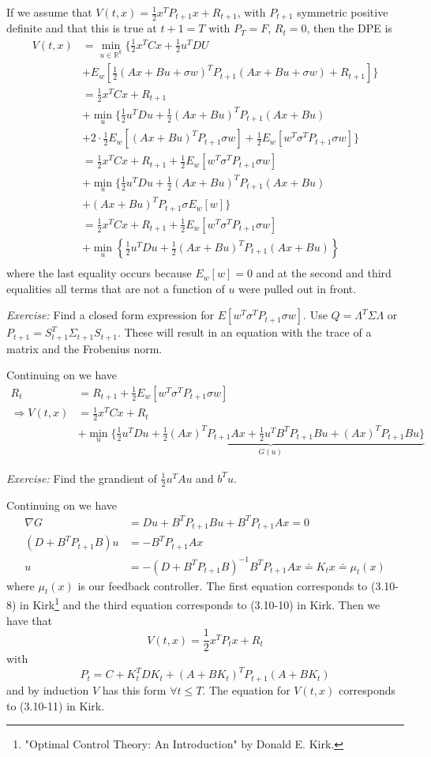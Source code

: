 If we assume that $V(t,x) = \frac{1}{2}x^TP_{t+1}x + R_{t+1}$, with $P_{t+1}$ symmetric positive definite and that this is true at $t+1=T$ with $P_T=F$, $R_t=0$, then the DPE is
\begin{align*}
V(t,x) &= \min_{u\in\mathbb{R}^k}\{\frac{1}{2}x^TCx + \frac{1}{2}u^TDU  \\
&+ E_w[\frac{1}{2}(Ax+Bu+\sigma w)^TP_{t+1}(Ax+Bu+\sigma w) + R_{t+1}]\} \\
&= \frac{1}{2}x^TCx + R_{t+1} \\
&+ \min_u \{\frac{1}{2}u^TDu + \frac{1}{2}(Ax+Bu)^TP_{t+1}(Ax+Bu) \\
&+ 2\cdot\frac{1}{2}E_w[(Ax+Bu)^TP_{t+1}\sigma w] + \frac{1}{2}E_w[w^T\sigma^TP_{t+1}\sigma w]\} \\
&= \frac{1}{2}x^TCx + R_{t+1} + \frac{1}{2}E_w[w^T\sigma^TP_{t+1}\sigma w] \\
&+ \min_u \{ \frac{1}{2}u^TDu + \frac{1}{2}(Ax+Bu)^TP_{t+1}(Ax+Bu) \\
&+ (Ax+Bu)^TP_{t+1}\sigma E_w[w] \} \\
&= \frac{1}{2}x^TCx + R_{t+1} + \frac{1}{2}E_w[w^T\sigma^TP_{t+1}\sigma w] \\
&+ \min_u \left\lbrace \frac{1}{2}u^TDu + \frac{1}{2}(Ax+Bu)^TP_{t+1}(Ax+Bu) \right\rbrace \\
\end{align*}
where the last equality occurs because $E_w[w]=0$ and at the second and third equalities all terms that are not a function of $u$ were pulled out in front.

\textit{Exercise:} Find a closed form expression for $E[w^T\sigma^TP_{t+1}\sigma w]$. Use $Q=\Lambda^T\Sigma\Lambda$ or $P_{t+1} = S_{t+1}^T\Sigma_{t+1}S_{t+1}$. These will result in an equation with the trace of a matrix and the Frobenius norm.

Continuing on we have
\begin{align*}
R_t &= R_{t+1} + \frac{1}{2}E_w[w^T\sigma^TP_{t+1}\sigma w] \\
\Rightarrow V(t,x) &= \frac{1}{2}x^TCx + R_t \\
&+ \min_u\{ \underbrace{\frac{1}{2}u^TDu + \frac{1}{2}(Ax)^TP_{t+1}Ax + \frac{1}{2}u^TB^TP_{t+1}Bu + (Ax)^TP_{t+1}Bu\}}_{G(u)}
\end{align*}

\textit{Exercise:} Find the grandient of $\frac{1}{2}u^TAu$ and $b^Tu$.

Continuing on we have
\begin{align*}
\nabla G &= Du + B^TP_{t+1}Bu + B^TP_{t+1}Ax = 0 \\
(D+B^TP_{t+1}B)u &= -B^TP_{t+1}Ax \\
u &= -(D+B^TP_{t+1}B)^{-1}B^TP_{t+1}Ax \doteq K_tx \doteq \mu_t(x)
\end{align*}
where $\mu_t(x)$ is our feedback controller. The first equation corresponds to (3.10-8) in Kirk\footnote{"Optimal Control Theory: An Introduction" by Donald E. Kirk.} and the third equation corresponds to (3.10-10) in Kirk. Then we have that
$$V(t,x) = \frac{1}{2}x^TP_tx + R_t$$
with
$$P_t = C+ K_t^TDK_t + (A+BK_t)^TP_{t+1}(A+BK_t)$$
and by induction $V$ has this form $\forall t\leq T$. The equation for $V(t,x)$ corresponds to (3.10-11) in Kirk.

